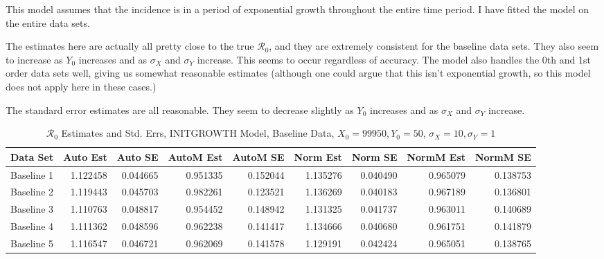 \documentclass[12pt]{article}
\newcommand{\rr}{\ensuremath{\mathcal{R}_0}}
\begin{document}
This model assumes that the incidence is in a period of exponential growth throughout the entire time period. I have fitted the model on the entire data sets.

The estimates here are actually all pretty close to the true $\rr$, and they are extremely consistent for the baseline data sets. They also seem to increase as $Y_0$ increases and as $\sigma_X$ and $\sigma_Y$ increase. This seems to occur regardless of accuracy. The model also handles the 0th and 1st order data sets well, giving us somewhat reasonable estimates (although one could argue that this isn't exponential growth, so this model does not apply here in these cases.)

The standard error estimates are all reasonable. They seem to decrease slightly as $Y_0$ increases and as $\sigma_X$ and $\sigma_Y$ increase.

\begin{table}[H]
	
	\caption{$\rr$ Estimates and Std. Errs, INITGROWTH Model, 
		Baseline Data, $X_0 = 99950, Y_0 = 50$, 
		$\sigma_X = 10, \sigma_Y = 1$}
	\begin{footnotesize}
		\hskip -1cm
		\begin{tabular}{l|r|r|r|r|r|r|r|r}
			\hline
			Data Set & Auto Est & Auto SE & AutoM Est & AutoM SE & Norm Est & Norm SE & NormM Est & NormM SE\\
			\hline
			Baseline 1 & 1.122458 & 0.044665 & 0.951335 & 0.152044 & 1.135276 & 0.040490 & 0.965079 & 0.138753\\
			\hline
			Baseline 2 & 1.119443 & 0.045703 & 0.982261 & 0.123521 & 1.136269 & 0.040183 & 0.967189 & 0.136801\\
			\hline
			Baseline 3 & 1.110763 & 0.048817 & 0.954452 & 0.148942 & 1.131325 & 0.041737 & 0.963011 & 0.140689\\
			\hline
			Baseline 4 & 1.111362 & 0.048596 & 0.962238 & 0.141417 & 1.134666 & 0.040680 & 0.961751 & 0.141879\\
			\hline
			Baseline 5 & 1.116547 & 0.046721 & 0.962069 & 0.141578 & 1.129191 & 0.042424 & 0.965051 & 0.138765\\
			\hline
		\end{tabular}
	\end{footnotesize}
\end{table}
\end{document}
